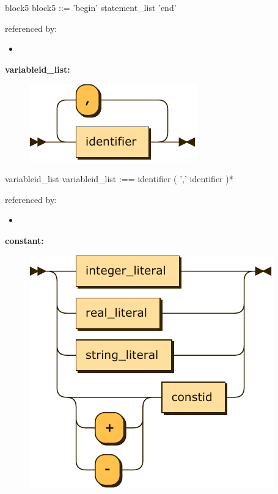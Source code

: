 \documentclass[10pt,a4paper,twoside]{article}
\providecommand{\tightlist}{%
  \setlength{\itemsep}{0pt}\setlength{\parskip}{0pt}}
\newcounter{grammarbox}[section]
\begin{document}
\begin{grammarbox}{block5}
\vspace{0.5em}
block5   ::= 'begin' statement\_list 'end'
\end{grammarbox}

referenced by:

\begin{itemize}
\tightlist
\item
\end{itemize}

\textbf{variableid\_list:}

\begin{figure}[H]
\centering
\includegraphics{diagram/variableid_list.pdf}

\end{figure}

\begin{grammarbox}{variableid\_list}
\ttfamily
\vspace*{0.5em}
variableid\_list :== identifier ( ',' identifier )*
\end{grammarbox}

referenced by:

\begin{itemize}
\tightlist
\item
\end{itemize}

\textbf{constant:}

\begin{figure}[H]
\centering
\includegraphics{diagram/constant.pdf}
\end{figure}
\end{document}
